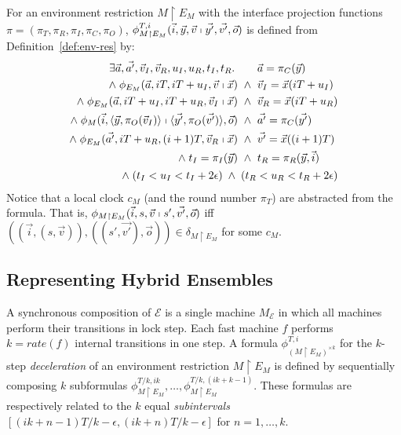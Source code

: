 \begin{definition}
For an environment restriction $M \restriction E_M$
with the interface projection functions $\pi=(\pi_T, \pi_R, \pi_I, \pi_C, \pi_O)$,
$\phi_{M \restriction E_M}^{T,i}(\vec{i}, \vec{y}, \vec{v} \shortmid \vec{y'}, \vec{v'}, \vec{o})$
is defined from Definition~\ref{def:env-res} by:
\begin{align*}
\begin{alignedat}{3}
\exists \vec{a},\vec{a'}, \vec{v}_I, \vec{v}_R, u_I, u_R, t_I, t_R.\;
&&&
\vec{a} = \pi_C(\vec{y})
\\
\wedge\;
\phi_{E_M}(\vec{a},iT,iT+u_I,\vec{v} \shortmid \vec{x})
&\;\;\wedge\;\;&&
\vec{v}_I = \vec{x}(iT+u_I)
\\
\wedge\;
\phi_{E_M}(\vec{a},iT+u_I,iT+u_R,\vec{v}_I \shortmid \vec{x})
&\;\;\wedge\;\;&&
\vec{v}_R = \vec{x}(iT+u_R)
\\
\wedge\;
\phi_M(\vec{i},\langle\vec{y},\pi_O(\vec{v}_I)\rangle \shortmid \langle\vec{y'},\pi_O(\vec{v'})\rangle, \vec{o})
&\;\;\wedge\;\;&&
\vec{a'} = \pi_C(\vec{y'})
\\
\wedge\;
\phi_{E_M}(\vec{a'},iT+u_R, (i+1)T ,\vec{v}_R \shortmid \vec{x})
&\;\;\wedge\;\;&&
\vec{v'} = \vec{x}((i+1)T)
\\
\wedge\;
t_I = \pi_I(\vec{y})
&\;\;\wedge\;\;&&
t_R = \pi_R(\vec{y},\vec{i})
\end{alignedat}
\\
\begin{alignedat}{3}
\wedge\;
(t_I < u_I < t_I + 2\epsilon)
\;\wedge\;
(t_R < u_R < t_R + 2\epsilon)
\end{alignedat}
\end{align*}
%
Notice that a local clock $c_M$ (and the round number $\pi_T$)
are abstracted from the formula.
That is,
$\phi_{M \restriction E_M}(\vec{i}, s, \vec{v} \shortmid s', \vec{v'}, \vec{o})$
iff
$( (\vec{i}, (s,\vec{v})), ((s',\vec{v'}), \vec{o}) ) \in \delta_{M \restriction E_M}$
for some $c_M$.
\end{definition}




\subsection{Representing Hybrid Ensembles}

A synchronous composition  of %
$\mathcal{E}$ is a single machine $M_\mathcal{E}$
in which all machines perform their transitions in lock step.
Each fast machine $f$  performs $k = \mathit{rate}(f)$  internal transitions in one step.
%
A formula 
$\phi_{(M \restriction E_M)^{\times k}}^{T, i}$
for the $k$-step \emph{deceleration} of an environment restriction 
$M \restriction E_M$
is defined by sequentially 
composing
$k$ subformulas $\phi_{M \restriction E_M}^{T/k,ik},\ldots,\phi_{M \restriction E_M}^{T/k,(ik+k-1)}$.
These formulas are respectively related to the $k$ equal \emph{subintervals} $[(ik+n-1)T/k-\epsilon,(ik+n)T/k-\epsilon]$ 
for $n=1,\ldots,k$.

